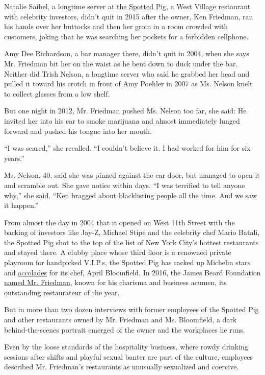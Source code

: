 Natalie Saibel, a longtime server at
\href{https://www.thespottedpig.com/\#home}{the Spotted Pig}, a West
Village restaurant with celebrity investors, didn't quit in 2015 after
the owner, Ken Friedman, ran his hands over her buttocks and then her
groin in a room crowded with customers, joking that he was searching her
pockets for a forbidden cellphone.

Amy Dee Richardson, a bar manager there, didn't quit in 2004, when she
says Mr. Friedman bit her on the waist as he bent down to duck under the
bar. Neither did Trish Nelson, a longtime server who said he grabbed her
head and pulled it toward his crotch in front of Amy Poehler in 2007 as
Ms. Nelson knelt to collect glasses from a low shelf.

But one night in 2012, Mr. Friedman pushed Ms. Nelson too far, she said:
He invited her into his car to smoke marijuana and almost immediately
lunged forward and pushed his tongue into her mouth.

``I was scared,'' she recalled. ``I couldn't believe it. I had worked
for him for six years.''

Ms. Nelson, 40, said she was pinned against the car door, but managed to
open it and scramble out. She gave notice within days. ``I was terrified
to tell anyone why,'' she said. ``Ken bragged about blacklisting people
all the time. And we saw it happen.''

From almost the day in 2004 that it opened on West 11th Street with the
backing of investors like Jay-Z, Michael Stipe and the celebrity chef
Mario Batali, the Spotted Pig shot to the top of the list of New York
City's hottest restaurants and stayed there. A clubby place whose third
floor is a renowned private playroom for handpicked V.I.P.s, the Spotted
Pig has racked up Michelin stars and
\href{http://www.nytimes.com/2006/01/25/dining/reviews/25rest.html}{accolades}
for its chef, April Bloomfield. In 2016, the James Beard Foundation
\href{https://www.jamesbeard.org/blog/2016-james-beard-award-winners}{named
Mr. Friedman}, known for his charisma and business acumen, its
outstanding restaurateur of the year.

But in more than two dozen interviews with former employees of the
Spotted Pig and other restaurants owned by Mr. Friedman and Ms.
Bloomfield, a dark behind-the-scenes portrait emerged of the owner and
the workplaces he runs.

Even by the loose standards of the hospitality business, where rowdy
drinking sessions after shifts and playful sexual banter are part of the
culture, employees described Mr. Friedman's restaurants as unusually
sexualized and coercive.

